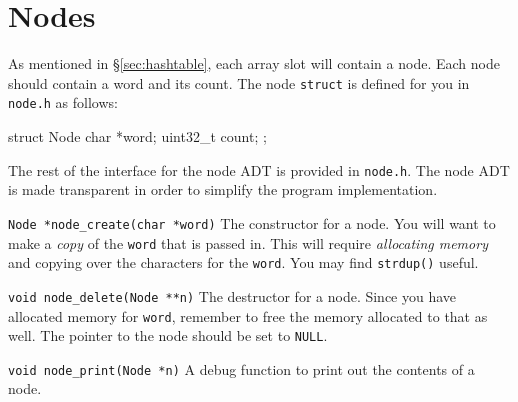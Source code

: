 \section{Nodes}\label{sec:node}

\noindent As mentioned in \S\ref{sec:hashtable}, each array slot will contain a
node. Each node should contain a word and its count. The node \texttt{struct} is
defined for you in \texttt{node.h} as follows:

\begin{clisting}{}
struct Node {
    char *word;
    uint32_t count;
};
\end{clisting}

The rest of the interface for the node ADT is provided in \texttt{node.h}. The
node ADT is made transparent in order to simplify the program implementation.

\begin{funcdoc}{\texttt{Node *node\_create(char *word)}}
  The constructor for a node. You will want to make a \emph{copy} of the
  \texttt{word} that is passed in. This will require \emph{allocating memory}
  and copying over the characters for the \texttt{word}. You may find
  \texttt{strdup()} useful.
\end{funcdoc}

\begin{funcdoc}{\texttt{void node\_delete(Node **n)}}
  The destructor for a node. Since you have allocated memory for \texttt{word},
  remember to free the memory allocated to that as well. The pointer to the node
  should be set to \texttt{NULL}.
\end{funcdoc}

\begin{funcdoc}{\texttt{void node\_print(Node *n)}}
  A debug function to print out the contents of a node.
\end{funcdoc}

